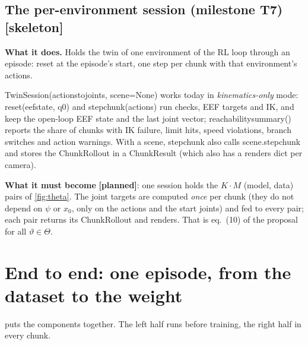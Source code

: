 \documentclass[11pt,a4paper]{article}
\newcommand{\skel}{\textcolor{skelamber}{\textbf{[skeleton]}}}
\newcommand{\planned}{\textcolor{plangray}{\textbf{[planned]}}}
\newcommand{\code}[1]{{\small\ttfamily\begingroup\def\_{\textunderscore\allowbreak}\def\/{/\allowbreak}#1\endgroup}}
\begin{document}
\subsection{The per-environment session (milestone T7) \skel}\label{sec:session}
\textbf{What it does.} Holds the twin of one environment of the RL loop through an episode: reset at the episode's start, one step per chunk with that environment's actions.

\begin{incode}[: \code{src/twin/session.py}]
\code{TwinSession(actions\_to\_joints, scene=None)} works today in \emph{kinematics-only} mode: \code{reset(eef\_state, q0)} and \code{step\_chunk(actions)} run checks, EEF targets and IK, and keep the open-loop EEF state and the last joint vector; \code{reachability\_summary()} reports the share of chunks with IK failure, limit hits, speed violations, branch switches and action warnings. With a \code{scene}, \code{step\_chunk} also calls \code{scene.step\_chunk} and stores the \code{ChunkRollout} in a \code{ChunkResult} (which also has a \code{renders} dict per camera).
\end{incode}

\textbf{What it must become} \planned: one session holds the $K\cdot M$ (model, data) pairs of \cref{fig:theta}. The joint targets are computed \emph{once} per chunk (they do not depend on $\psi$ or $x_0$, only on the actions and the start joints) and fed to every pair; each pair returns its \code{ChunkRollout} and renders. That is eq.~(10) of the proposal for all $\vartheta\in\Theta$.

\section{End to end: one episode, from the dataset to the weight}\label{sec:flow}
 puts the components together. The left half runs before training, the right half in every chunk.
\end{document}
